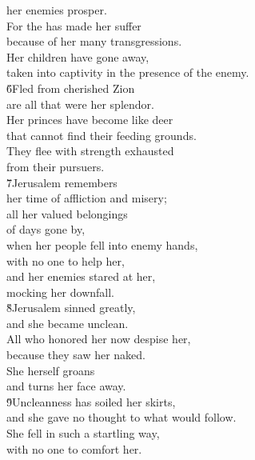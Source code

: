 \begin{poetry}
\poemll    her enemies prosper. \\
\poeml For the  has made her suffer \\
\poemll    because of her many transgressions. \\
\poeml Her children have gone away, \\
\poemll    taken into captivity in the presence of the enemy. \\
\poeml \v{6}Fled from cherished Zion \\
\poemll    are all that were her splendor. \\
\poeml Her princes have become like deer \\
\poemll    that cannot find their feeding grounds. \\
\poeml They flee with strength exhausted \\
\poemll    from their pursuers. \\
\poeml \v{7}Jerusalem remembers \\
\poemll    her time of affliction and misery; \\
\poeml all her valued belongings \\
\poemll    of days gone by, \\
\poeml when her people fell into enemy hands, \\
\poemll    with no one to help her, \\
\poeml and her enemies stared at her, \\
\poemll    mocking her downfall. \\
\poeml \v{8}Jerusalem sinned greatly, \\
\poemll    and she became unclean. \\
\poeml All who honored her now despise her, \\
\poemll    because they saw her naked. \\
\poeml She herself groans \\
\poemll    and turns her face away. \\
\poeml \v{9}Uncleanness has soiled her skirts, \\
\poemll    and she gave no thought to what would follow. \\
\poeml She fell in such a startling way, \\
\poemll    with no one to comfort her. \\

\end{poetry}
